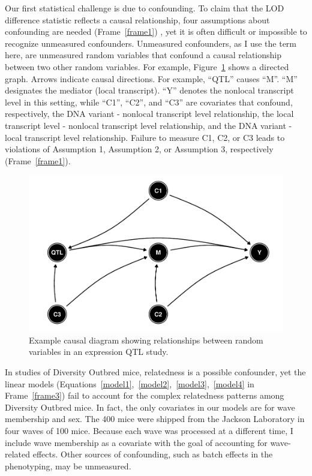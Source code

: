 \documentclass[oneside]{book}\usepackage[]{graphicx}\usepackage[]{color}
\begin{document}
Our first statistical challenge is due to confounding. To claim that the LOD 
difference statistic reflects a causal relationship, four assumptions about 
confounding are needed (Frame~\ref{frame1}) \citep{vanderweele2015explanation}, 
yet
it is often difficult or impossible to recognize unmeasured confounders. Unmeasured 
confounders, as I use the term here, are unmeasured random variables that confound a causal 
relationship between two other random variables. 
For example, Figure~\ref{fig:confounding} shows a directed graph. Arrows indicate causal 
directions. For example, ``QTL'' causes ``M''. ``M'' designates the mediator (local transcript). ``Y'' denotes the nonlocal transcript 
level in this setting, while ``C1'', ``C2'', and ``C3'' are covariates that confound, 
respectively, the DNA variant - nonlocal transcript level relationship, the local transcript 
level - nonlocal transcript level relationship, and the DNA variant - local transcript level 
relationship. Failure to measure C1, C2, or C3 leads to violations of Assumption 1, 
Assumption 2, or Assumption 3, respectively (Frame~\ref{frame1}). 

\begin{figure}
\includegraphics{figs/confounding.pdf}
\caption{Example causal diagram showing relationships between random variables in an expression QTL study.}\label{fig:confounding}
\end{figure}



In studies of Diversity Outbred mice, relatedness is a possible confounder, 
yet the linear models (Equations~\ref{model1},~\ref{model2},~\ref{model3},~\ref{model4}
in Frame~\ref{frame3}) fail to account for the complex relatedness patterns 
among Diversity Outbred mice. 
In fact, the only covariates in our models are for wave membership and sex.
The 400 mice were shipped from the Jackson Laboratory in four waves of 100 mice. 
Because each wave was processed at a different time, I include wave membership 
as a covariate with the goal of accounting for wave-related effects.
Other sources of confounding, such as batch effects in the phenotyping, may be 
unmeasured.
\end{document}
